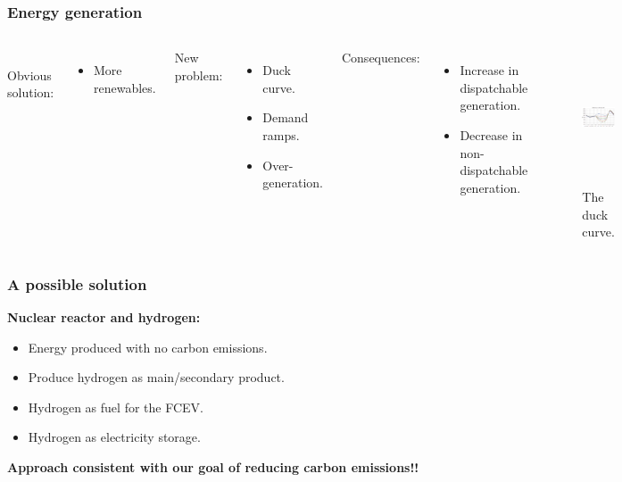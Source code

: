 \begin{frame}
\frametitle{Energy generation}
\begin{columns}
	\column[t]{4cm}
	\\
	Obvious solution:
	\begin{itemize}
		\item More renewables.
	\end{itemize}

    New problem:
	\begin{itemize}
		\item Duck curve.
		\item Demand ramps.
		\item Over-generation.
	\end{itemize}

    Consequences:
	\begin{itemize}
		\item Increase in dispatchable generation.
		\item Decrease in non-dispatchable generation.
	\end{itemize}

    \column[t]{6cm}
	\begin{figure}[htbp!]
		\begin{center}
			\includegraphics[height=4.0cm]{images/caiso-duck.png}
		\end{center}
		\caption{The duck curve.}
	\end{figure}
\end{columns}
\end{frame}


\begin{frame}
\frametitle{A possible solution}
\centering
    \textbf{Nuclear reactor and hydrogen:}
	\begin{itemize}
		\item Energy produced with no carbon emissions.
		\item Produce hydrogen as main/secondary product.
		\item Hydrogen as fuel for the FCEV.
		\item Hydrogen as electricity storage.
	\end{itemize}
	\vspace{1cm}
	\textbf{Approach consistent with our goal of reducing carbon emissions!!}
\end{frame}
